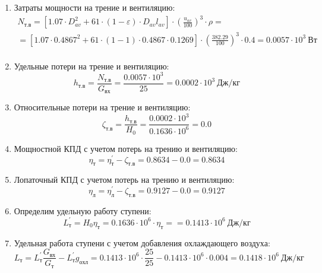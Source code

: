 \documentclass[a4paper,10pt]{article}
\begin{document}
\begin{enumerate}
        \item Затраты мощности на трение и вентиляцию:
        \begin{gather*}
            N_{т.в} = \left[
                    1.07 \cdot D_{av}^2 + 61 \cdot (1 - \varepsilon) \cdot D_{av} l_{av}
            \right] \cdot
            \left(
                \frac{ u_{av} }{ 100 }
            \right) ^ 3 \cdot
            \rho =\\
            = \left[
                1.07 \cdot 0.4867^2 +
                61 \cdot (1 - 1) \cdot
                0.4867 \cdot 0.1269
            \right] \cdot
            \left(
                \frac{ 382.29 }{ 100 }
            \right) ^ 3 \cdot
            0.4
            = 0.0057 \cdot 10^3 \ Вт \\
        \end{gather*}

        \item Удельные потери на трение и вентиляцию:
        \[
            h_{т.в} = \frac{ N_{т.в} }{ G_{вх} } =
                \frac{
                    0.0057 \cdot 10^3
                }{
                    25
                }
            = 0.0002 \cdot 10^3 \ Дж/кг
        \]

        \item Относительные потери на трение и вентиляцию:
        \[
            \zeta_{т.в} = \frac{ h_{т.в} }{ H_0 } =
                \frac{ 0.0002 \cdot 10^3 }{ 0.1636 \cdot 10^6 } =
            0.0
        \]

        \item Мощностной КПД с учетом потерь на трению и вентиляцию:
        \[
            \eta_т = \eta_т^\prime - \zeta_{т.в} =
                0.8634 - 0.0 =
            0.8634
        \]

        \item Лопаточный КПД с учетом потерь на трению и вентиляцию:
        \[
            \eta_л = \eta_л^\prime - \zeta_{т.в} =
                0.9127 - 0.0 =
            0.9127
        \]

        
        \item Определим удельную работу ступени:
        \[
            L_т^\prime = H_0 \eta_т = 0.1636 \cdot 10^6 \cdot \eta_т =
            = 0.1413 \cdot 10^6 \ Дж/кг
        \]
        

        \item Удельная работа ступени с учетом добавления охлаждающего воздуха:
        \[
            L_т = L_т^\prime \frac{ G_{вх} }{ G_т }  - L_т^\prime g_{охл} =
                0.1413 \cdot 10^6 \cdot
                \frac{ 25 }{ 25 }  -
                0.1413 \cdot 10^6 \cdot 0.004 =
            0.1418 \cdot 10^6 \ Дж/кг
        \]


\end{enumerate}
\end{document}
